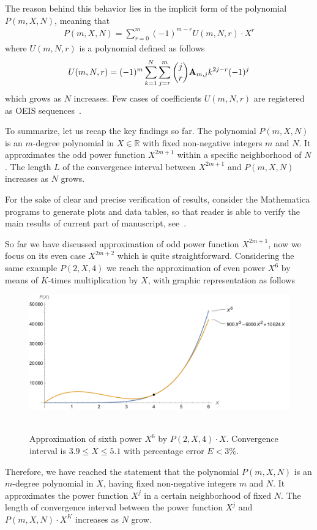 The reason behind this behavior lies in the implicit form of the polynomial $P(m,X,N)$,
meaning that
\begin{align*}
    P(m,X,N) = \sum_{r=0}^{m} (-1)^{m-r} U(m, N, r) \cdot X^{r}
\end{align*}
where $U(m, N, r)$ is a polynomial defined as follows
\begin{align*}
    U(m, N, r) = (-1)^m \sum_{k=1}^{N} \sum_{j=r}^{m} \binom{j}{r} {\mathbf{A}} \sb{m,j} k^{2j-r} (-1)^j
\end{align*}
which grows as $N$ increases.
Few cases of coefficients $U(m, N, r)$ are registered as OEIS sequences~\cite{
    oeis_coefficients_u_m_l_k_defined_by_polynomial_identity_1,
    oeis_coefficients_u_m_l_k_defined_by_polynomial_identity_2,
    oeis_coefficients_u_m_l_k_defined_by_polynomial_identity_3}.

To summarize, let us recap the key findings so far.
The polynomial $P(m,X,N)$ is an $m$-degree polynomial in $X \in \mathbb{R}$ with fixed non-negative integers $m$ and $N$.
It approximates the odd power function $X^{2m+1}$ within a specific neighborhood of $N$.
The length $L$ of the convergence interval between $X^{2m+1}$ and $P(m,X,N)$ increases as $N$ grows.

For the sake of clear and precise verification of results, consider the Mathematica programs to generate
plots and data tables, so that reader is able to verify the main results of current part of manuscript,
see~\cite{kolosovpetro_gist}.

So far we have discussed approximation of odd power function $X^{2m+1}$, now we focus on its even case $X^{2m+2}$
which is quite straightforward.
Considering the same example $P(2, X, 4)$ we reach the approximation of even power $X^6$
by means of $K$-times multiplication by $X$, with graphic representation as follows
\begin{figure}[H]
    \centering
    \includegraphics[width=1\textwidth]{sections/images/07_plot_of_6th_power_with_p_2_4_times_x}
    ~\caption{Approximation of sixth power $X^6$ by $P(2, X, 4) \cdot X$.
    Convergence interval is $3.9 \leq X \leq 5.1$ with percentage error $E < 3\%$.
    }\label{fig:07_plot_of_6th_power_with_p_2_4_times_x}
\end{figure}
Therefore, we have reached the statement that
the polynomial $P(m,X,N)$ is an $m$-degree polynomial in $X$, having fixed non-negative
integers $m$ and $N$.
It approximates the power function $X^{j}$ in a certain neighborhood of fixed $N$.
The length of convergence interval between the power function $X^j$ and $P(m,X,N) \cdot X^K$ increases as $N$ grow.

